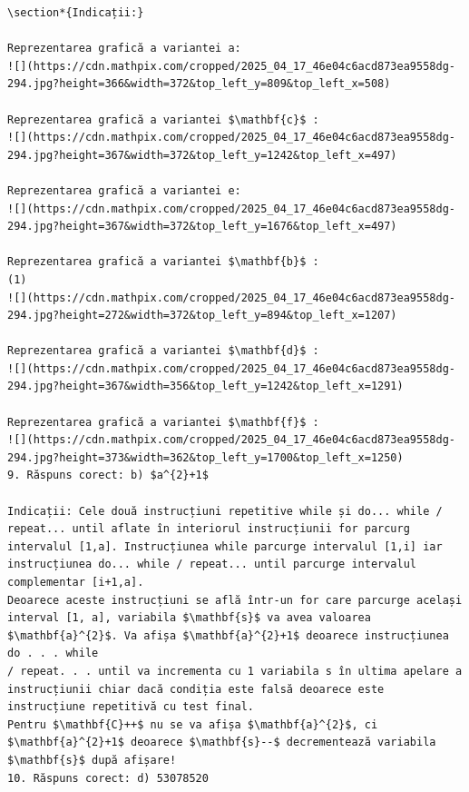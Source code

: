 \documentclass[10pt]{article}
\begin{document}
\begin{verbatim}
\section*{Indicații:}

Reprezentarea grafică a variantei a:
![](https://cdn.mathpix.com/cropped/2025_04_17_46e04c6acd873ea9558dg-294.jpg?height=366&width=372&top_left_y=809&top_left_x=508)

Reprezentarea grafică a variantei $\mathbf{c}$ :
![](https://cdn.mathpix.com/cropped/2025_04_17_46e04c6acd873ea9558dg-294.jpg?height=367&width=372&top_left_y=1242&top_left_x=497)

Reprezentarea grafică a variantei e:
![](https://cdn.mathpix.com/cropped/2025_04_17_46e04c6acd873ea9558dg-294.jpg?height=367&width=372&top_left_y=1676&top_left_x=497)

Reprezentarea grafică a variantei $\mathbf{b}$ :
(1)
![](https://cdn.mathpix.com/cropped/2025_04_17_46e04c6acd873ea9558dg-294.jpg?height=272&width=372&top_left_y=894&top_left_x=1207)

Reprezentarea grafică a variantei $\mathbf{d}$ :
![](https://cdn.mathpix.com/cropped/2025_04_17_46e04c6acd873ea9558dg-294.jpg?height=367&width=356&top_left_y=1242&top_left_x=1291)

Reprezentarea grafică a variantei $\mathbf{f}$ :
![](https://cdn.mathpix.com/cropped/2025_04_17_46e04c6acd873ea9558dg-294.jpg?height=373&width=362&top_left_y=1700&top_left_x=1250)
9. Răspuns corect: b) $a^{2}+1$

Indicații: Cele două instrucțiuni repetitive while și do... while / repeat... until aflate în interiorul instrucțiunii for parcurg intervalul [1,a]. Instrucțiunea while parcurge intervalul [1,i] iar instrucțiunea do... while / repeat... until parcurge intervalul complementar [i+1,a].
Deoarece aceste instrucțiuni se află într-un for care parcurge același interval [1, a], variabila $\mathbf{s}$ va avea valoarea $\mathbf{a}^{2}$. Va afișa $\mathbf{a}^{2}+1$ deoarece instrucțiunea do . . . while
/ repeat. . . until va incrementa cu 1 variabila s în ultima apelare a instrucțiunii chiar dacă condiția este falsă deoarece este instrucțiune repetitivă cu test final.
Pentru $\mathbf{C}++$ nu se va afișa $\mathbf{a}^{2}$, ci $\mathbf{a}^{2}+1$ deoarece $\mathbf{s}--$ decrementează variabila $\mathbf{s}$ după afișare!
10. Răspuns corect: d) 53078520


\end{verbatim}
\end{document}
